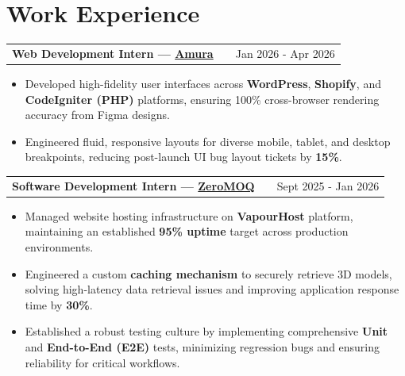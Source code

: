 \documentclass[a4paper,11pt]{article}
\makeatletter
\newenvironment{joblong}[2]
    {
    \begin{tabularx}{\linewidth}{@{}l X r@{}}
    \textbf{#1} & \hfill &  #2 \\[3.75pt]
    \end{tabularx}
    \begin{minipage}[t]{\linewidth}
    \begin{itemize}[nosep,after=\strut, leftmargin=1em, itemsep=3pt,label=--]
    }
    {
    \end{itemize}
    \end{minipage}    
    }
\makeatother
\begin{document}
\vspace{0pt} %
\section{Work Experience}

\begin{joblong}{Web Development Intern — \href{https://www.amuratech.com/}{Amura}}{Jan 2026 - Apr 2026}
\item Developed high-fidelity user interfaces across \textbf{WordPress}, \textbf{Shopify}, and \textbf{CodeIgniter (PHP)} platforms, ensuring 100\% cross-browser rendering accuracy from Figma designs.
\item Engineered fluid, responsive layouts for diverse mobile, tablet, and desktop breakpoints, reducing post-launch UI bug layout tickets by \textbf{15\%}.
\end{joblong}
\vspace{-4pt} %

\begin{joblong}{Software Development Intern — \href{https://www.zeromoq.com/}{ZeroMOQ}}{Sept 2025 - Jan 2026}
\item Managed website hosting infrastructure on \textbf{VapourHost} platform, maintaining an established \textbf{95\% uptime} target across production environments.
\item Engineered a custom \textbf{caching mechanism} to securely retrieve 3D models, solving high-latency data retrieval issues and improving application response time by \textbf{30\%}.
\item Established a robust testing culture by implementing comprehensive \textbf{Unit} and \textbf{End-to-End (E2E)} tests, minimizing regression bugs and ensuring reliability for critical workflows.
\end{joblong}
\end{document}
